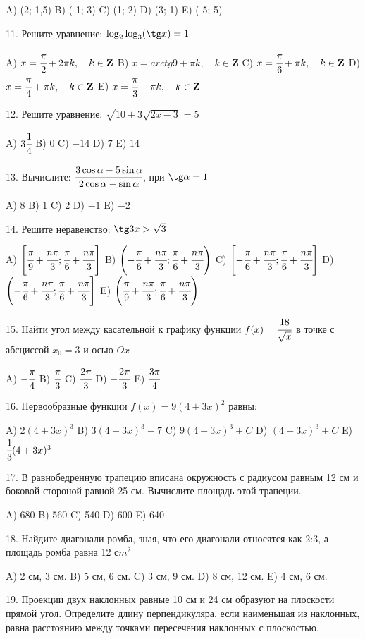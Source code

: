 \documentclass[12pt]{article}
\begin{document}
A) (2; 1,5)
B) (-1; 3)
C) (1; 2)
D) (3; 1)
E) (-5; 5)

11. Решите уравнение: $\log_2\log_3(\tg x)=1$

A) $x=\cfrac{\pi}{2} + 2\pi k, \quad k \in \mathbf{Z}$
B) $x=arctg 9 + \pi k, \quad k \in \mathbf{Z}$
C) $x=\cfrac{\pi}{6} + \pi k, \quad k \in \mathbf{Z}$
D) $x=\cfrac{\pi}{4} + \pi k, \quad k \in \mathbf{Z}$
E) $x=\cfrac{\pi}{3} + \pi k, \quad k \in \mathbf{Z}$

12. Решите уравнение: $\sqrt{10 + 3\sqrt{2x - 3}}=5$

A) $3\cfrac{1}{4}$
B) $0$
C) $-14$
D) $7$
E) $14$

13. Вычислите: $\cfrac{3\cos\alpha-5\sin\alpha}{2\cos\alpha-\sin\alpha}$, при $\tg\alpha=1$

A) $8$
B) $1$
C) $2$
D) $-1$
E) $-2$

14. Решите неравенство: $\tg 3x > \sqrt{3}$

A) $\left[ \cfrac{\pi}{9} + \cfrac{n\pi}{3}; \cfrac{\pi}{6} + \cfrac{n\pi}{3} \right]$
B) $\left( -\cfrac{\pi}{6} + \cfrac{n\pi}{3}; \cfrac{\pi}{6} + \cfrac{n\pi}{3} \right)$
C) $\left[ -\cfrac{\pi}{6} + \cfrac{n\pi}{3}; \cfrac{\pi}{6} + \cfrac{n\pi}{3} \right]$
D) $\left( -\cfrac{\pi}{6} + \cfrac{n\pi}{3}; \cfrac{\pi}{6} + \cfrac{n\pi}{3} \right]$
E) $\left( \cfrac{\pi}{9} + \cfrac{n\pi}{3}; \cfrac{\pi}{6} + \cfrac{n\pi}{3} \right)$

15. Найти угол между касательной к графику функции $f(x)=\cfrac{18}{\sqrt{x}}$ в точке с абсциссой $x_0=3$ и осью $Ox$

A) $-\cfrac{\pi}{4}$
B) $\cfrac{\pi}{3}$
C) $\cfrac{2\pi}{3}$
D) $-\cfrac{2\pi}{3}$
E) $\cfrac{3\pi}{4}$

16. Первообразные функции $f(x)=9(4+3x)^2$ равны: 

A) $2(4+3x)^3$
B) $3(4+3x)^3 + 7$
C) $9(4+3x)^3 + C$
D) $(4+3x)^3 + C$
E) $\cfrac{1}{3}(4+3x)^3$

17. В равнобедренную трапецию вписана окружность с радиусом равным 12 см и боковой стороной равной 25 см. Вычислите площадь этой трапеции. 

A) 680
B) 560
C) 540
D) 600
E) 640

18. Найдите диагонали ромба, зная, что его диагонали относятся как 2:3, а площадь ромба равна 12 с$m^2$

A) 2 см, 3 см.
B) 5 см, 6 см.
C) 3 см, 9 см.
D) 8 см, 12 см.
E) 4 см, 6 см.

19. Проекции двух наклонных равные 10 см и 24 см образуют на плоскости прямой угол. Определите длину перпендикуляра, если наименьшая из наклонных, равна расстоянию между точками пересечения наклонных с плоскостью. 
\end{document}
